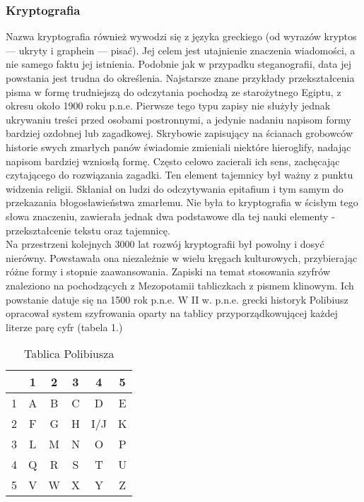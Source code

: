 \documentclass[a4paper]{article}
\begin{document}
\subsubsection{Kryptografia}
Nazwa kryptografia również wywodzi się z języka greckiego (od wyrazów kryptos — ukryty i graphein
— pisać). Jej celem jest utajnienie znaczenia wiadomości, a nie samego faktu jej istnienia.
Podobnie jak w przypadku steganografii, data jej powstania jest trudna do określenia. Najstarsze
znane przykłady przekształcenia pisma w formę trudniejszą do odczytania pochodzą ze starożytnego
Egiptu, z okresu około 1900 roku p.n.e. Pierwsze tego typu zapisy nie służyły jednak ukrywaniu
treści przed osobami postronnymi, a jedynie nadaniu napisom formy bardziej ozdobnej lub zagadkowej.
Skrybowie zapisujący na ścianach grobowców historie swych zmarłych panów świadomie
zmieniali niektóre hieroglify, nadając napisom bardziej wzniosłą formę. Często celowo zacierali ich
sens, zachęcając czytającego do rozwiązania zagadki. Ten element tajemnicy był ważny z punktu
widzenia religii. Skłaniał on ludzi do odczytywania epitafium i tym samym do przekazania błogosławieństwa
zmarłemu. Nie była to kryptografia w ścisłym tego słowa znaczeniu, zawierała jednak
dwa podstawowe dla tej nauki elementy - przekształcenie tekstu oraz tajemnicę. \\
Na przestrzeni kolejnych 3000 lat rozwój kryptografii był powolny i dosyć nierówny. Powstawała
ona niezależnie w wielu kręgach kulturowych, przybierając różne formy i stopnie zaawansowania.
Zapiski na temat stosowania szyfrów znaleziono na pochodzących z Mezopotamii tabliczkach z
pismem klinowym. Ich powstanie datuje się na 1500 rok p.n.e. W II w. p.n.e. grecki historyk Polibiusz
opracował system szyfrowania oparty na tablicy przyporządkowującej każdej literze parę
cyfr (tabela 1.)
\begin{table}[h]
\centering\caption{Tablica Polibiusza}
\begin{tabular}{| c | c | c | c | c | c |}
\hline
 & 1 & 2 & 3 & 4 & 5 \\
\hline
1 & A & B & C & D & E \\
\hline
2 & F & G & H & I/J & K \\
\hline
3 & L & M & N & O & P \\
\hline
4 & Q & R & S & T & U \\
\hline
5 & V & W & X & Y & Z \\
\hline
\end{tabular}
\end{table}
\end{document}
